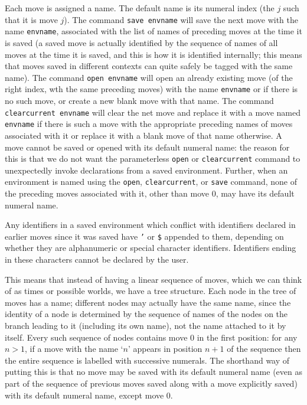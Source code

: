 \documentclass[12pt]{article}
\begin{document}
Each move is assigned a name.  The default name is its numeral index (the $j$ such that it is move $j$).  The command {\tt save envname} will save the next move with the name
{\tt envname}, associated with the list of names of preceding moves at the time it is saved (a saved move is actually identified by the sequence of names of all moves at the time it is saved, and this is how it is identified internally;  this means that moves saved in different contexts can quite safely be tagged with the same name).  The command {\tt open envname} will open an already existing move (of the right index, wth the same preceding moves) with the name
{\tt envname} or if there is no such move, or create a new blank move with that name.  The command {\tt clearcurrent envname} will clear the net move and replace it with a move named {\tt envname} if there is such a move with the appropriate preceding names of moves associated with it or replace it with a blank move of that name otherwise.  A move cannot be saved or opened with its default numeral name:  the reason for this is that we do not want the
parameterless {\tt open} or {\tt clearcurrent} command to unexpectedly invoke declarations from a saved environment.  Further, when an environment is named using the {\tt open}, {\tt clearcurrent}, or {\tt save} command, none of the preceding moves associated with it, other than move 0, may have its default numeral name.

Any identifiers in a saved environment which conflict with identifiers declared in earlier moves since it was saved have {\tt '} or {\tt \$} appended to them, depending on whether they are alphanumeric or special character identifiers.  Identifiers ending in these characters cannot be declared by the user.

This means that instead of having a linear sequence of moves, which we can think of as times or possible worlds, we have a tree structure.  Each node in the tree of moves has a name;  different nodes may actually have the same name, since the identity of a node is determined by the sequence of names of the nodes on the branch leading to it (including its own name), not the name attached to it by itself.  Every such sequence of nodes contains move 0 in the first position:  for any $n>1$, if a move with the name `$n$' appears in position $n+1$ of the sequence then the entire sequence is labelled with successive numerals.  The shorthand way of putting this is that no move may be saved with its default numeral name (even as part of the sequence of previous moves saved along with a move explicitly saved) with its default numeral name, except move 0.
\end{document}
